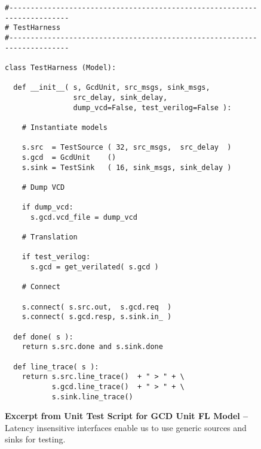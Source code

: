 
\begin{figure}

  \begin{lstlisting}[xleftmargin={0.9in}]
#-------------------------------------------------------------------------
# TestHarness
#-------------------------------------------------------------------------

class TestHarness (Model):

  def __init__( s, GcdUnit, src_msgs, sink_msgs,
                src_delay, sink_delay,
                dump_vcd=False, test_verilog=False ):

    # Instantiate models

    s.src  = TestSource ( 32, src_msgs,  src_delay  )
    s.gcd  = GcdUnit    ()
    s.sink = TestSink   ( 16, sink_msgs, sink_delay )

    # Dump VCD

    if dump_vcd:
      s.gcd.vcd_file = dump_vcd

    # Translation

    if test_verilog:
      s.gcd = get_verilated( s.gcd )

    # Connect

    s.connect( s.src.out,  s.gcd.req  )
    s.connect( s.gcd.resp, s.sink.in_ )

  def done( s ):
    return s.src.done and s.sink.done

  def line_trace( s ):
    return s.src.line_trace()  + " > " + \
           s.gcd.line_trace()  + " > " + \
           s.sink.line_trace()
\end{lstlisting}

  \caption{\textbf{Excerpt from Unit Test Script for GCD Unit FL Model
      --} Latency insensitive interfaces enable us to use generic sources
    and sinks for testing.}
  \label{code-tut3-gcd-fl-test}

\end{figure}

